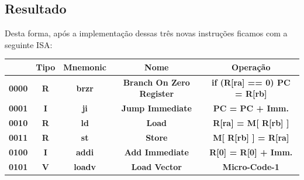 \documentclass{article}  %
\begin{document}
    \subsection{Resultado}

    Desta forma, após a implementação dessas três novas instruções ficamos com a seguinte ISA:

    \begin{table}[H]
      \noindent\hspace*{-1.75cm}%
      \begin{tabular}{|c|*{4}{c|}}
        \hline
        \rowcolor{gray!50}
        \multicolumn{1}{|c|}{\textbf{Opcode}} & \multicolumn{1}{|c|}{\textbf{Tipo}} & \multicolumn{1}{|c|}{\textbf{Mnemonic}} & \multicolumn{1}{|c|}{\textbf{Nome}}                   & \multicolumn{1}{|c|}{\textbf{Operação}}  \\ \hline
        \multicolumn{1}{|c|}{\textbf{0000}}    & \multicolumn{1}{c|}{\textbf{R}}     & \multicolumn{1}{c|}{\textbf{brzr}}      & \multicolumn{1}{c|}{\textbf{Branch On Zero Register}} & \multicolumn{1}{c|}{\textbf{if (R[ra] == 0) PC = R[rb]}}  \\ \hline
        \multicolumn{1}{|c|}{\textbf{0001}}    & \multicolumn{1}{c|}{\textbf{I}}     & \multicolumn{1}{c|}{\textbf{ji}}        & \multicolumn{1}{c|}{\textbf{Jump Immediate}}          & \multicolumn{1}{c|}{\textbf{PC = PC + Imm.}}  \\ \hline
        \multicolumn{1}{|c|}{\textbf{0010}}    & \multicolumn{1}{c|}{\textbf{R}}     & \multicolumn{1}{c|}{\textbf{ld}}        & \multicolumn{1}{c|}{\textbf{Load}}                    & \multicolumn{1}{c|}{\textbf{R[ra] = M[ R[rb] ]}}  \\ \hline
        \multicolumn{1}{|c|}{\textbf{0011}}    & \multicolumn{1}{c|}{\textbf{R}}     & \multicolumn{1}{c|}{\textbf{st}}        & \multicolumn{1}{c|}{\textbf{Store}}                   & \multicolumn{1}{c|}{\textbf{M[ R[rb] ] = R[ra]}}  \\ \hline
        \multicolumn{1}{|c|}{\textbf{0100}}    & \multicolumn{1}{c|}{\textbf{I}}     & \multicolumn{1}{c|}{\textbf{addi}}      & \multicolumn{1}{c|}{\textbf{Add Immediate}}           & \multicolumn{1}{c|}{\textbf{R[0] = R[0] + Imm.}}  \\ \hline
        \multicolumn{1}{|c|}{\textbf{0101}}    & \multicolumn{1}{c|}{\textbf{V}}     & \multicolumn{1}{c|}{\textbf{loadv}}     & \multicolumn{1}{c|}{\textbf{Load Vector}}             & \multicolumn{1}{c|}{\textbf{Micro-Code-1}}  \\ \hline

\end{tabular}
\end{table}
\end{document}

